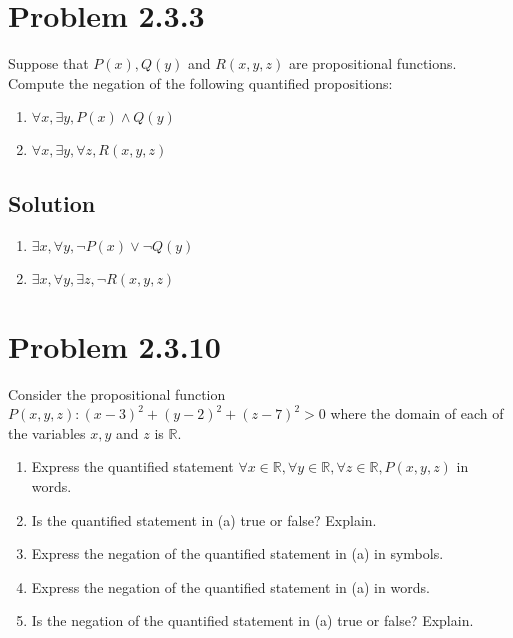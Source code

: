 \documentclass[12pt]{extarticle}
\begin{document}
\section*{Problem 2.3.3}

Suppose that $P(x), Q(y)$ and $R(x, y, z)$ are propositional functions. Compute the negation of the following quantified propositions: 
\begin{enumerate}[label=(\alph*)]
	\item $\forall x, \exists y, P(x) \land Q(y) $
	\item $\forall x, \exists y, \forall z, R(x, y, z)$
\end{enumerate}

\subsection*{Solution}

\begin{enumerate}[label=(\alph*)]
	\item $\exists x, \forall y, \lnot P(x) \lor \lnot Q(y)$
	\item $\exists x, \forall y, \exists z, \lnot R(x,y,z)$
\end{enumerate}

\section*{Problem 2.3.10}

Consider the propositional function $P(x, y, z) : (x - 3)^2 + (y - 2)^2 + (z - 7)^2 > 0$ where the domain of each of the variables $x, y$ and $z$ is $\mathbb{R}$. 
\begin{enumerate}[label=(\alph*)]
	\item Express the quantified statement $\forall x \in \mathbb{R}, \forall y \in \mathbb{R}, \forall z \in \mathbb{R}, P(x, y, z)$ in words. 
	\item Is the quantified statement in (a) true or false? Explain. 
	\item Express the negation of the quantified statement in (a) in symbols. 
	\item Express the negation of the quantified statement in (a) in words. 
	\item Is the negation of the quantified statement in (a) true or false? Explain.
\end{enumerate}
\end{document}
